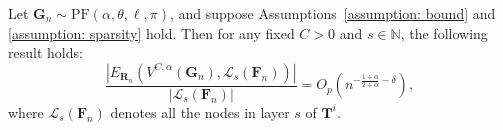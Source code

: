 \documentclass[twoside,11pt]{article}
\theoremstyle{remark}
\begin{document}
\begin{lemma}
\label{lemma layer noise general}
Let $\boldsymbol{G}_n \sim \mathrm{PF}(\alpha, \theta, \ell, \pi)$, and suppose Assumptions~\ref{assumption: bound} and \ref{assumption: sparsity} hold. Then for any fixed $C > 0$ and $s\in \mathbb{N}$, the following result holds:
%
\begin{equation}
\label{lemma layer noise general  eqn 1}
\frac{\left|E_{\boldsymbol{R}_n}\left(V^{C, \alpha}\left(\boldsymbol{G}_n\right), \mathcal{L}_s\left(\boldsymbol{F}_n\right)\right)\right|}{\left| \mathcal{L}_s\left(\boldsymbol{F}_n\right)\right|}= O_p\left(n^{-\frac{1+\alpha}{2+\alpha}-\delta}\right),
\end{equation}
%
where $\mathcal{L}_s\left(\boldsymbol{F}_n\right)$ denotes all the nodes in layer $s$ of $\boldsymbol{T}^i$.
\end{lemma}
\end{document}

